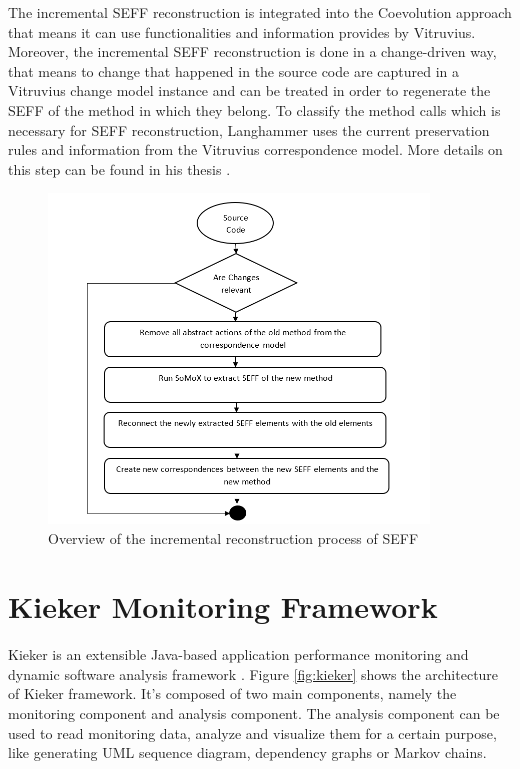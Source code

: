 The incremental SEFF reconstruction is integrated into the Coevolution approach that means it can use functionalities and information provides by Vitruvius. Moreover, the incremental SEFF reconstruction is done in a change-driven way, that means to change that happened in the source code are captured in a Vitruvius change model instance and can be treated in order to regenerate the SEFF of the method in which they belong. To classify the method calls which is necessary for SEFF reconstruction, Langhammer uses the current preservation rules and information from the Vitruvius correspondence model. More details on this step can be found in his thesis \cite{langhammer2017automated}.

\begin{figure}[h]
\centering
\includegraphics[width=0.9\textwidth]{figures/inscremental_seff_reconst}
\caption{Overview of the incremental reconstruction process of SEFF}
\label{fig:seff incremental reconst}
\end{figure}


\section{Kieker Monitoring Framework}
\label{sec:Kieker Monitoring}
Kieker is an extensible Java-based application performance monitoring and dynamic software analysis framework \cite{van2009continuous}. Figure \ref{fig:kieker} shows the architecture of Kieker framework. It's composed of two main components, namely the monitoring component and analysis component.   The analysis component can be used to read monitoring data, analyze and visualize them for a certain purpose, like generating UML sequence diagram, dependency graphs or Markov chains.

